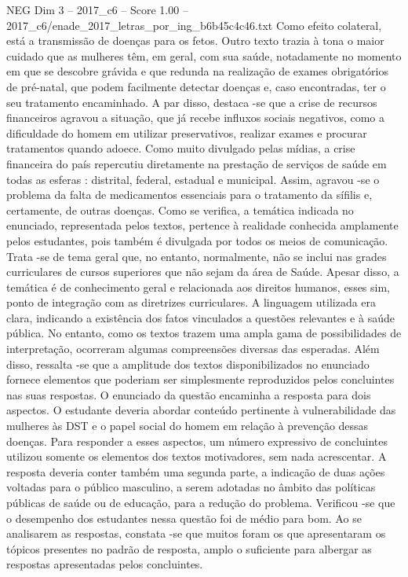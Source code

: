 \begin{textsample}{NEG Dim 3 – 2017\_c6 – Score 1.00 – 2017\_c6/enade\_2017\_letras\_por\_ing\_b6b45c4c46.txt}
Como efeito colateral, está a transmissão de doenças para os fetos.
Outro texto trazia à tona o maior cuidado que as mulheres têm, em geral, com sua saúde, notadamente no momento em que se descobre grávida e que redunda na realização de exames obrigatórios de pré-natal, que podem facilmente detectar doenças e, caso encontradas, ter o seu tratamento encaminhado.
A par disso, destaca -se que a crise de recursos financeiros agravou a situação, que já recebe influxos sociais negativos, como a dificuldade do homem em utilizar preservativos, realizar exames e procurar tratamentos quando adoece.
Como muito divulgado pelas mídias, a crise financeira do país repercutiu diretamente na prestação de serviços de saúde em todas as esferas : distrital, federal, estadual e municipal.
Assim, agravou -se o problema da falta de medicamentos essenciais para o tratamento da sífilis e, certamente, de outras doenças.
Como se verifica, a temática indicada no enunciado, representada pelos textos, pertence à realidade conhecida amplamente pelos estudantes, pois também é divulgada por todos os meios de comunicação.
Trata -se de tema geral que, no entanto, normalmente, não se inclui nas grades curriculares de cursos superiores que não sejam da área de Saúde.
Apesar disso, a temática é de conhecimento geral e relacionada aos direitos humanos, esses sim, ponto de integração com as diretrizes curriculares.
A linguagem utilizada era clara, indicando a existência dos fatos vinculados a questões relevantes e à saúde pública.
No entanto, como os textos trazem uma ampla gama de possibilidades de interpretação, ocorreram algumas compreensões diversas das esperadas.
Além disso, ressalta -se que a amplitude dos textos disponibilizados no enunciado fornece elementos que poderiam ser simplesmente reproduzidos pelos concluintes nas suas respostas.
O enunciado da questão encaminha a resposta para dois aspectos.
O estudante deveria abordar conteúdo pertinente à vulnerabilidade das mulheres às DST e o papel social do homem em relação à prevenção dessas doenças.
Para responder a esses aspectos, um número expressivo de concluintes utilizou somente os elementos dos textos motivadores, sem nada acrescentar.
A resposta deveria conter também uma segunda parte, a indicação de duas ações voltadas para o público masculino, a serem adotadas no âmbito das políticas públicas de saúde ou de educação, para a redução do problema.
Verificou -se que o desempenho dos estudantes nessa questão foi de médio para bom.
Ao se analisarem as respostas, constata -se que muitos foram os que apresentaram os tópicos presentes no padrão de resposta, amplo o suficiente para albergar as respostas apresentadas pelos concluintes.

\end{textsample}
